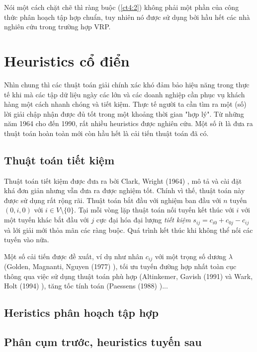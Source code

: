 Nói một cách chặt chẽ thì ràng buộc (\ref{ct4:2}) không phải một phần của công thức phân hoạch tập hợp chuẩn, tuy nhiên nó được sử dụng bởi hầu hết các nhà nghiên cứu trong trường hợp VRP.

\section{Heuristics cổ điển}

Nhìn chung thì các thuật toán giải chính xác khó đảm bảo hiệu năng trong thực tế khi mà các tập dữ liệu ngày các lớn và các doanh nghiệp cần phục vụ khách hàng một cách nhanh chóng và tiết kiệm. Thực tế người ta cần tìm ra một (số) lời giải chập nhận được đủ tốt trong một khoảng thời gian "hợp lý". Từ những năm 1964 cho đến 1990, rất nhiều heuristics được nghiên cứu. Một số ít là đưa ra thuật toán hoàn toàn mới còn hầu hết là cải tiến thuật toán đã có. 

\subsection{Thuật toán tiết kiệm}

Thuật toán tiết kiệm được đưa ra bởi Clark, Wright (1964) \cite{clarke1964scheduling}, mô tả và cài đặt khá đơn giản nhưng vẫn đưa ra được nghiệm tốt. Chính vì thế, thuật toán này được sử dụng rất rộng rãi. Thuật toán bắt đầu với nghiệm ban đầu với $n$ tuyến $(0, i, 0)$ với $i \in V \setminus \{0\}$. Tại mỗi vòng lặp thuật toán nối tuyến kết thúc với $i$ với một tuyến khác bắt đầu với $j$ cực đại hóa đại lượng \textit{tiết kiệm} $s_{ij}=c_{i0} + c_{0j} - c_{ij}$ và lới giải mới thỏa mãn các ràng buộc. Quá trình kết thúc khi không thể nối các tuyến vào nữa. 

Một số cải tiến được đề xuất, ví dụ như nhân $c_{ij}$ với một trọng số dương $\lambda$ (Golden, Magnanti, Nguyen (1977) \cite{golden1977implementing}), tối ưu tuyến đường hợp nhất toàn cục thông qua việc sử dụng thuật toán phù hợp (Altinkemer, Gavish (1991) \cite{altinkemer1991parallel} và Wark, Holt (1994) \cite{wark1994repeated}), tăng tốc tính toán (Paessens (1988) \cite{})... 

\subsection{Heristics phân hoạch tập hợp}



\subsection{Phân cụm trước, heuristics tuyến sau}
